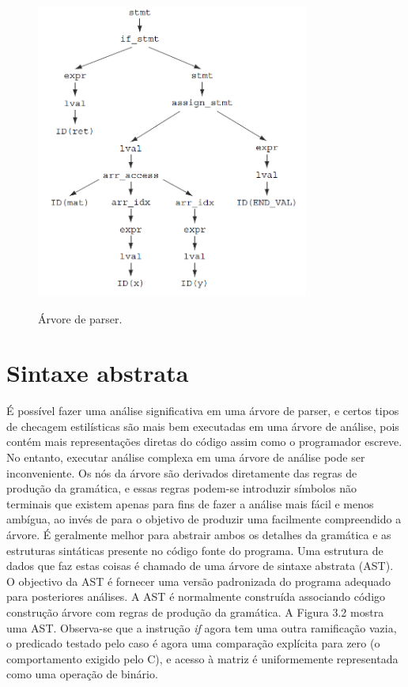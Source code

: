 	\clearpage
	\begin{figure}[h]
		\center
		\includegraphics[width=0.8\textwidth]{Imagens/Arvore}
		\label{Arvore de parser}
		\caption{Árvore de parser.}
	\end{figure}

	\section{Sintaxe abstrata}

	É possível fazer uma análise significativa em uma árvore de parser, e certos tipos de checagem estilísticas são mais bem executadas em uma árvore de análise, pois contém mais representações diretas do código assim como o programador escreve. No entanto, executar análise complexa em uma árvore de análise pode ser inconveniente. Os nós da árvore são derivados diretamente das regras de produção da gramática, e essas regras podem-se introduzir símbolos não terminais que existem apenas para fins de fazer a análise mais fácil e menos ambígua, ao invés de para o objetivo de produzir uma facilmente compreendido a árvore. É geralmente melhor para abstrair ambos os detalhes da gramática e as estruturas sintáticas presente no código fonte do programa. Uma estrutura de dados que faz estas coisas é chamado de uma árvore de sintaxe abstrata (AST). O objectivo da AST é fornecer uma versão padronizada do programa adequado para posteriores análises. A AST é normalmente construída associando código construção árvore com regras de produção da gramática. A Figura 3.2 mostra uma AST. Observa-se que a instrução {\it if} agora tem uma outra ramificação vazia, o predicado testado pelo caso é agora uma comparação explícita para zero (o comportamento exigido pelo C), e acesso à matriz é uniformemente representada como uma operação de binário.\\
	
